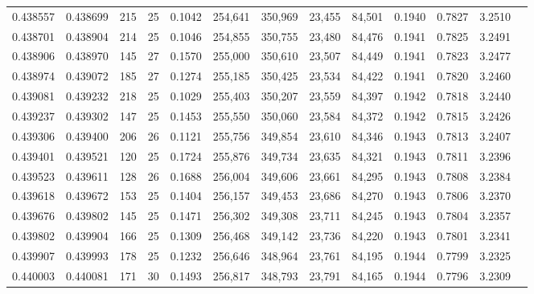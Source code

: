 \begin{tabular}{rrrrrrrrrrrrr}
0.438557 & 0.438699 & 215 &  25 &                                     0.1042 & 254,641 & 350,969 &  23,455 &  84,501 & 0.1940 & 0.7827 & 3.2510 \\
0.438701 & 0.438904 & 214 &  25 &                                     0.1046 & 254,855 & 350,755 &  23,480 &  84,476 & 0.1941 & 0.7825 & 3.2491 \\
0.438906 & 0.438970 & 145 &  27 &                                     0.1570 & 255,000 & 350,610 &  23,507 &  84,449 & 0.1941 & 0.7823 & 3.2477 \\
0.438974 & 0.439072 & 185 &  27 &                                     0.1274 & 255,185 & 350,425 &  23,534 &  84,422 & 0.1941 & 0.7820 & 3.2460 \\
0.439081 & 0.439232 & 218 &  25 &                                     0.1029 & 255,403 & 350,207 &  23,559 &  84,397 & 0.1942 & 0.7818 & 3.2440 \\
0.439237 & 0.439302 & 147 &  25 &                                     0.1453 & 255,550 & 350,060 &  23,584 &  84,372 & 0.1942 & 0.7815 & 3.2426 \\
0.439306 & 0.439400 & 206 &  26 &                                     0.1121 & 255,756 & 349,854 &  23,610 &  84,346 & 0.1943 & 0.7813 & 3.2407 \\
0.439401 & 0.439521 & 120 &  25 &                                     0.1724 & 255,876 & 349,734 &  23,635 &  84,321 & 0.1943 & 0.7811 & 3.2396 \\
0.439523 & 0.439611 & 128 &  26 &                                     0.1688 & 256,004 & 349,606 &  23,661 &  84,295 & 0.1943 & 0.7808 & 3.2384 \\
0.439618 & 0.439672 & 153 &  25 &                                     0.1404 & 256,157 & 349,453 &  23,686 &  84,270 & 0.1943 & 0.7806 & 3.2370 \\
0.439676 & 0.439802 & 145 &  25 &                                     0.1471 & 256,302 & 349,308 &  23,711 &  84,245 & 0.1943 & 0.7804 & 3.2357 \\
0.439802 & 0.439904 & 166 &  25 &                                     0.1309 & 256,468 & 349,142 &  23,736 &  84,220 & 0.1943 & 0.7801 & 3.2341 \\
0.439907 & 0.439993 & 178 &  25 &                                     0.1232 & 256,646 & 348,964 &  23,761 &  84,195 & 0.1944 & 0.7799 & 3.2325 \\
0.440003 & 0.440081 & 171 &  30 &                                     0.1493 & 256,817 & 348,793 &  23,791 &  84,165 & 0.1944 & 0.7796 & 3.2309 \\

\end{tabular}
